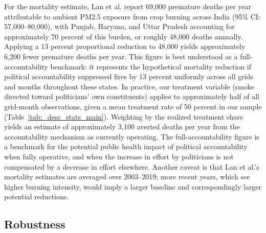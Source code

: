 \documentclass[12pt]{article}
\begin{document}
For the mortality estimate, Lan et al. report 69,000 premature deaths per year attributable to ambient PM2.5 exposure from crop burning across India (95\% CI: 57,000–80,000), with Punjab, Haryana, and Uttar Pradesh accounting for approximately 70 percent of this burden, or roughly 48,000 deaths annually. Applying a 13 percent proportional reduction to 48,000 yields approximately 6,200 fewer premature deaths per year. This figure is best understood as a full-accountability benchmark: it represents the hypothetical mortality reduction if political accountability suppressed fires by 13 percent uniformly across all grids and months throughout these states. In practice, our treatment variable (smoke directed toward politicians' own constituents) applies to approximately half of all grid-month observations, given a mean treatment rate of 50 percent in our sample (Table~\ref{tab:_desc_stats_main}). Weighting by the realized treatment share yields an estimate of approximately 3,100 averted deaths per year from the accountability mechanism as currently operating. The full-accountability figure is a benchmark for the potential public health impact of political accountability when fully operative, and when the increase in effort by politicians is not compensated by a decrease in effort elsewhere. Another caveat is that Lan et al.'s mortality estimates are averaged over 2003–2019; more recent years, which see higher burning intensity, would imply a larger baseline and correspondingly larger potential reductions.



\newpage 
\subsection{Robustness}
\end{document}

